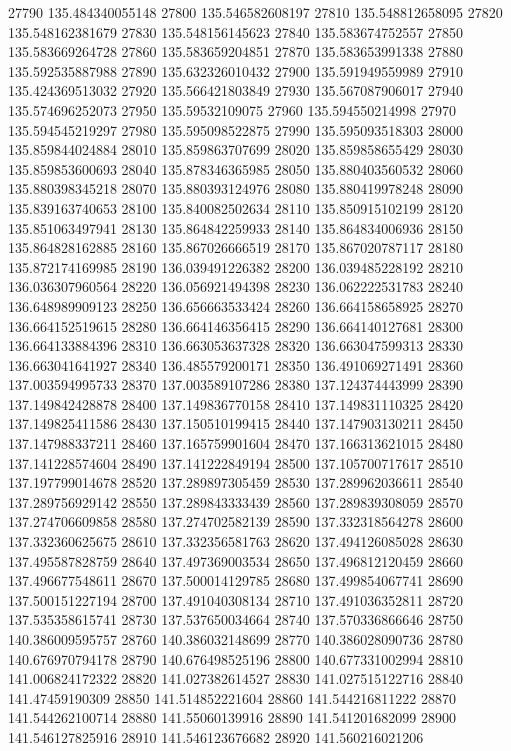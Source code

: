 {27790 135.484340055148
27800 135.546582608197
27810 135.548812658095
27820 135.548162381679
27830 135.548156145623
27840 135.583674752557
27850 135.583669264728
27860 135.583659204851
27870 135.583653991338
27880 135.592535887988
27890 135.632326010432
27900 135.591949559989
27910 135.424369513032
27920 135.566421803849
27930 135.567087906017
27940 135.574696252073
27950 135.59532109075
27960 135.594550214998
27970 135.594545219297
27980 135.595098522875
27990 135.595093518303
28000 135.859844024884
28010 135.859863707699
28020 135.859858655429
28030 135.859853600693
28040 135.878346365985
28050 135.880403560532
28060 135.880398345218
28070 135.880393124976
28080 135.880419978248
28090 135.839163740653
28100 135.840082502634
28110 135.850915102199
28120 135.851063497941
28130 135.864842259933
28140 135.864834006936
28150 135.864828162885
28160 135.867026666519
28170 135.867020787117
28180 135.872174169985
28190 136.039491226382
28200 136.039485228192
28210 136.036307960564
28220 136.056921494398
28230 136.062222531783
28240 136.648989909123
28250 136.656663533424
28260 136.664158658925
28270 136.664152519615
28280 136.664146356415
28290 136.664140127681
28300 136.664133884396
28310 136.663053637328
28320 136.663047599313
28330 136.663041641927
28340 136.485579200171
28350 136.491069271491
28360 137.003594995733
28370 137.003589107286
28380 137.124374443999
28390 137.149842428878
28400 137.149836770158
28410 137.149831110325
28420 137.149825411586
28430 137.150510199415
28440 137.147903130211
28450 137.147988337211
28460 137.165759901604
28470 137.166313621015
28480 137.141228574604
28490 137.141222849194
28500 137.105700717617
28510 137.197799014678
28520 137.289897305459
28530 137.289962036611
28540 137.289756929142
28550 137.289843333439
28560 137.289839308059
28570 137.274706609858
28580 137.274702582139
28590 137.332318564278
28600 137.332360625675
28610 137.332356581763
28620 137.494126085028
28630 137.495587828759
28640 137.497369003534
28650 137.496812120459
28660 137.496677548611
28670 137.500014129785
28680 137.499854067741
28690 137.500151227194
28700 137.491040308134
28710 137.491036352811
28720 137.535358615741
28730 137.537650034664
28740 137.570336866646
28750 140.386009595757
28760 140.386032148699
28770 140.386028090736
28780 140.676970794178
28790 140.676498525196
28800 140.677331002994
28810 141.006824172322
28820 141.027382614527
28830 141.027515122716
28840 141.47459190309
28850 141.514852221604
28860 141.544216811222
28870 141.544262100714
28880 141.55060139916
28890 141.541201682099
28900 141.546127825916
28910 141.546123676682
28920 141.560216021206
}
